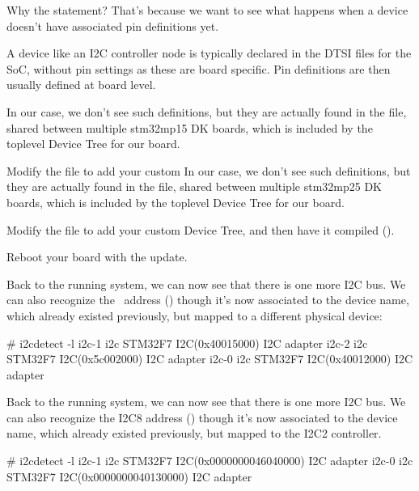 Why the  statement? That's because we want
to see what happens when a device doesn't have associated pin
definitions yet.

A device like an I2C controller node is typically declared in the DTSI
files for the SoC, without pin settings as these are board
specific. Pin definitions are then usually defined at board level.

\if{}
      In our case, we don't see such definitions, but they are actually
      found in the 
      file, shared between multiple stm32mp15 DK boards, which is included
      by the toplevel Device Tree for our board.

      Modify the  file to add your custom
\fi
\if{}
      In our case, we don't see such definitions, but they are actually
      found in the 
      file, shared between multiple stm32mp25 DK boards, which is included
      by the toplevel Device Tree for our board.

      Modify the  file to add your custom
\fi
Device Tree, and then have it compiled ().

Reboot your board with the update.

\if{}
      Back to the running system, we can now see that there is one more
      I2C bus. We can also recognize the \busname\ address ()
      though it's now associated to the  device name, which
      already existed previously, but mapped to a different physical device:

      \begin{bashinput}
      # i2cdetect -l
      i2c-1	i2c             STM32F7 I2C(0x40015000)                 I2C adapter
      i2c-2	i2c             STM32F7 I2C(0x5c002000)                 I2C adapter
      i2c-0	i2c             STM32F7 I2C(0x40012000)                 I2C adapter
      \end{bashinput}
\fi
\if{}
      Back to the running system, we can now see that there is one more
      I2C bus. We can also recognize the I2C8 address ()
      though it's now associated to the  device name, which
      already existed previously, but mapped to the I2C2 controller.

      \begin{bashinput}
      # i2cdetect -l 
      i2c-1	i2c       	STM32F7 I2C(0x0000000046040000) 	I2C adapter
      i2c-0	i2c       	STM32F7 I2C(0x0000000040130000) 	I2C adapter
      \end{bashinput}

